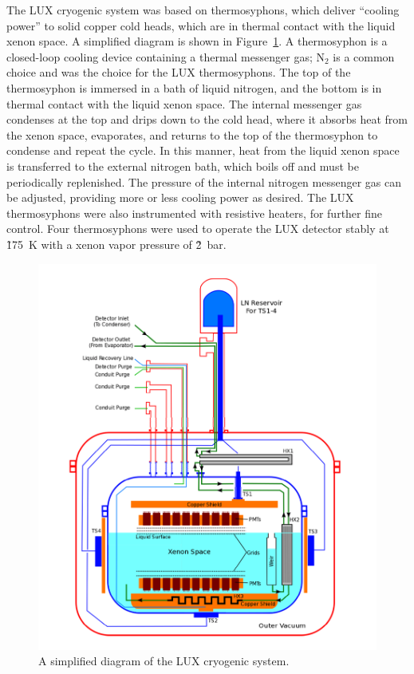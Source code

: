 The \ac{LUX} cryogenic system was based on thermosyphons, which deliver ``cooling power'' to solid copper cold heads, which are in thermal contact with the liquid xenon space. A simplified diagram is shown in Figure~\ref{fig:luxcryo}. A thermosyphon is a closed-loop cooling device containing a thermal messenger gas; N$_{2}$ is a common choice and was the choice for the \ac{LUX} thermosyphons. The top of the thermosyphon is immersed in a bath of liquid nitrogen, and the bottom is in thermal contact with the liquid xenon space. The internal messenger gas condenses at the top and drips down to the cold head, where it absorbs heat from the xenon space, evaporates, and returns to the top of the thermosyphon to condense and repeat the cycle. In this manner, heat from the liquid xenon space is transferred to the external nitrogen bath, which boils off and must be periodically replenished. The pressure of the internal nitrogen messenger gas can be adjusted, providing more or less cooling power as desired. The \ac{LUX} thermosyphons were also instrumented with resistive heaters, for further fine control. Four thermosyphons were used to operate the \ac{LUX} detector stably at \~175~K with a xenon vapor pressure of \~2~bar. 

\begin{figure}[htbp]
\begin{center}
\includegraphics[width=\textwidth]{figures/lux/lux_cryostats.png}
\caption{A simplified diagram of the LUX cryogenic system. \cite{NicolesThesis}}
\label{fig:luxcryo}
\end{center}
\end{figure}

